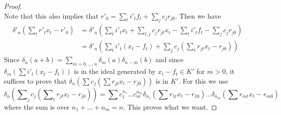 \documentclass[10pt,a4paper]{amsart}
\theoremstyle{plain}
\theoremstyle{definition}
\theoremstyle{remark}
\numberwithin{equation}{subsection}
\begin{document}
\begin{proof}
$$$$
Note that this also implies that
$r'_0 = \sum_t i'_t f_t + \sum_j c_j r_{j0}$.
Then we have
\begin{align*}
\delta'_n(\sum\nolimits_t r'_t x_t  - r'_0)
& =
\delta'_n(
\sum\nolimits_t i'_t x_t +
\sum\nolimits_{t, j} c_j r_{jt} x_t -
\sum\nolimits_t i'_t f_t -
\sum\nolimits_j c_j r_{j0}) \\
& =
\delta'_n(
\sum\nolimits_t i'_t(x_t - f_t) +
\sum\nolimits_j c_j (\sum\nolimits_t r_{jt} x_t  - r_{j0}))
\end{align*}
Since $\delta_n(a + b) = \sum_{m = 0, \ldots, n} \delta_m(a) \delta_{n - m}(b)$
and since $\delta_m(\sum i'_t(x_t - f_t))$ is in the ideal
generated by $x_t - f_t \in K'$ for $m > 0$, it suffices to prove that
$\delta_n(\sum c_j (\sum r_{jt} x_t  - r_{j0}))$ is in $K'$.
For this we use
$$
\delta_n(\sum\nolimits_j c_j (\sum\nolimits_t r_{jt} x_t  - r_{j0}))
=
\sum c_1^{n_1} \ldots c_m^{n_m}
\delta_{n_1}(\sum r_{1t} x_t  - r_{10}) \ldots
\delta_{n_m}(\sum r_{mt} x_t  - r_{m0})
$$
where the sum is over $n_1 + \ldots + n_m = n$. This proves what we want.
\end{proof}
\end{document}
